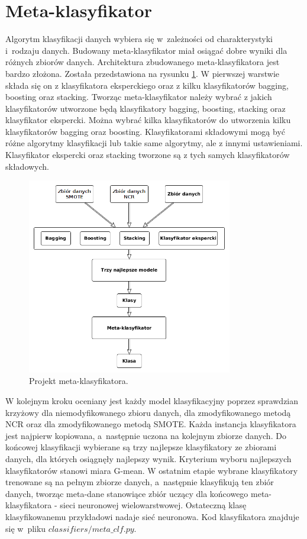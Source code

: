 \section{Meta-klasyfikator}
Algorytm klasyfikacji danych wybiera się w~zależności od charakterystyki i~rodzaju danych. Budowany meta-klasyfikator miał osiągać dobre wyniki dla różnych zbiorów danych. Architektura zbudowanego meta-klasyfikatora jest bardzo złożona. Została przedstawiona na rysunku \ref{fig:metaklasmoj}. W pierwszej warstwie składa się on z klasyfikatora eksperckiego oraz z kilku klasyfikatorów bagging, boosting oraz stacking. Tworząc meta-klasyfikator należy wybrać z jakich klasyfikatorów utworzone będą klasyfikatory bagging, boosting, stacking oraz klasyfikator ekspercki. Można wybrać kilka klasyfikatorów do utworzenia kilku klasyfikatorów bagging oraz boosting. Klasyfikatorami składowymi mogą być różne algorytmy klasyfikacji lub takie same algorytmy, ale z innymi ustawieniami. Klasyfikator ekspercki oraz stacking tworzone są z tych samych klasyfikatorów składowych. 
\begin{figure}[H]
	\centering
	\includegraphics[width=0.8\textwidth]{./images/metaklas.png}
	\caption{Projekt meta-klasyfikatora.}
	\label{fig:metaklasmoj}
\end{figure}W kolejnym kroku oceniany jest każdy model klasyfikacyjny poprzez sprawdzian krzyżowy dla niemodyfikowanego zbioru danych, dla zmodyfikowanego metodą NCR oraz dla zmodyfikowanego metodą SMOTE. Każda instancja klasyfikatora jest najpierw kopiowana, a~następnie uczona na kolejnym zbiorze danych. Do końcowej klasyfikacji wybierane są trzy najlepsze klasyfikatory ze zbiorami danych, dla których osiągnęły najlepszy wynik. Kryterium wyboru najlepszych klasyfikatorów stanowi miara G-mean. W ostatnim etapie wybrane klasyfikatory trenowane są na pełnym zbiorze danych, a~następnie klasyfikują ten zbiór danych, tworząc meta-dane stanowiące zbiór uczący dla końcowego meta-klasyfikatora - sieci neuronowej wielowarstwowej. Ostateczną klasę klasyfikowanemu przykładowi nadaje sieć neuronowa. Kod klasyfikatora znajduje się w~pliku $classifiers/meta\_clf.py$.

